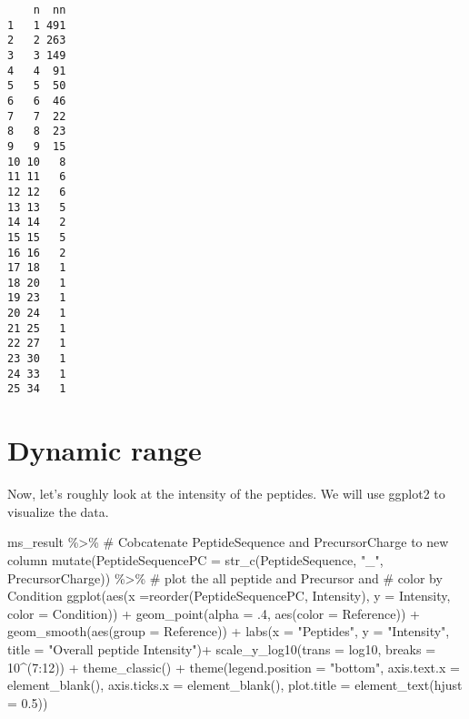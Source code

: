 \documentclass[
  letterpaper,
  DIV=11,
  numbers=noendperiod]{scrartcl}
\newenvironment{Shaded}{\begin{snugshade}}{\end{snugshade}}
\newcommand{\AttributeTok}[1]{\textcolor[rgb]{0.40,0.45,0.13}{#1}}
\newcommand{\CommentTok}[1]{\textcolor[rgb]{0.37,0.37,0.37}{#1}}
\newcommand{\DecValTok}[1]{\textcolor[rgb]{0.68,0.00,0.00}{#1}}
\newcommand{\FloatTok}[1]{\textcolor[rgb]{0.68,0.00,0.00}{#1}}
\newcommand{\FunctionTok}[1]{\textcolor[rgb]{0.28,0.35,0.67}{#1}}
\newcommand{\NormalTok}[1]{\textcolor[rgb]{0.00,0.23,0.31}{#1}}
\newcommand{\SpecialCharTok}[1]{\textcolor[rgb]{0.37,0.37,0.37}{#1}}
\newcommand{\StringTok}[1]{\textcolor[rgb]{0.13,0.47,0.30}{#1}}
\begin{document}
\begin{verbatim}
    n  nn
1   1 491
2   2 263
3   3 149
4   4  91
5   5  50
6   6  46
7   7  22
8   8  23
9   9  15
10 10   8
11 11   6
12 12   6
13 13   5
14 14   2
15 15   5
16 16   2
17 18   1
18 20   1
19 23   1
20 24   1
21 25   1
22 27   1
23 30   1
24 33   1
25 34   1
\end{verbatim}

\section{Dynamic range}\label{dynamic-range}

Now, let's roughly look at the intensity of the peptides. We will use
ggplot2 to visualize the data.

\begin{Shaded}
\begin{Highlighting}[]
\NormalTok{ms\_result }\SpecialCharTok{\%\textgreater{}\%} 
  \CommentTok{\# Cobcatenate PeptideSequence and PrecursorCharge to new column}
  \FunctionTok{mutate}\NormalTok{(}\AttributeTok{PeptideSequencePC =} \FunctionTok{str\_c}\NormalTok{(PeptideSequence, }\StringTok{"\_"}\NormalTok{, PrecursorCharge)) }\SpecialCharTok{\%\textgreater{}\%}
  \CommentTok{\# plot the all peptide and Precursor and }
  \CommentTok{\# color by Condition}
  \FunctionTok{ggplot}\NormalTok{(}\FunctionTok{aes}\NormalTok{(}\AttributeTok{x =}\FunctionTok{reorder}\NormalTok{(PeptideSequencePC, Intensity), }
  \AttributeTok{y =}\NormalTok{ Intensity, }\AttributeTok{color =}\NormalTok{ Condition)) }\SpecialCharTok{+}
  \FunctionTok{geom\_point}\NormalTok{(}\AttributeTok{alpha =}\NormalTok{ .}\DecValTok{4}\NormalTok{, }\FunctionTok{aes}\NormalTok{(}\AttributeTok{color =}\NormalTok{ Reference)) }\SpecialCharTok{+} 
  \FunctionTok{geom\_smooth}\NormalTok{(}\FunctionTok{aes}\NormalTok{(}\AttributeTok{group =}\NormalTok{ Reference)) }\SpecialCharTok{+}
  \FunctionTok{labs}\NormalTok{(}\AttributeTok{x =} \StringTok{"Peptides"}\NormalTok{, }\AttributeTok{y =} \StringTok{"Intensity"}\NormalTok{,}
  \AttributeTok{title =} \StringTok{"Overall peptide Intensity"}\NormalTok{)}\SpecialCharTok{+} 
  \FunctionTok{scale\_y\_log10}\NormalTok{(}\AttributeTok{trans =} \StringTok{\textquotesingle{}log10\textquotesingle{}}\NormalTok{, }\AttributeTok{breaks =} \DecValTok{10}\SpecialCharTok{\^{}}\NormalTok{(}\DecValTok{7}\SpecialCharTok{:}\DecValTok{12}\NormalTok{)) }\SpecialCharTok{+} 
  \FunctionTok{theme\_classic}\NormalTok{() }\SpecialCharTok{+}
  \FunctionTok{theme}\NormalTok{(}\AttributeTok{legend.position =} \StringTok{"bottom"}\NormalTok{,}
  \AttributeTok{axis.text.x =} \FunctionTok{element\_blank}\NormalTok{(),}
  \AttributeTok{axis.ticks.x =} \FunctionTok{element\_blank}\NormalTok{(),}
  \AttributeTok{plot.title =} \FunctionTok{element\_text}\NormalTok{(}\AttributeTok{hjust =} \FloatTok{0.5}\NormalTok{)) }
\end{Highlighting}
\end{Shaded}
\end{document}
